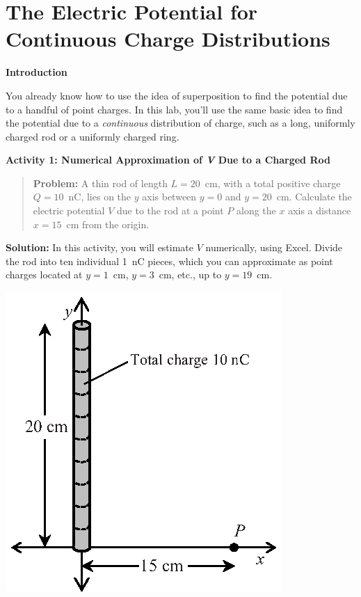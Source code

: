 \section{The Electric Potential for Continuous Charge Distributions}
\label{potential_charge_distributions}


\makelabheader %

\bigskip

\textbf{Introduction} 

You already know how to use the idea of superposition to find the potential due to a handful of point charges.  In this lab, you'll use the same basic idea to find the potential due to a \textit{continuous} distribution of charge, such as a long, uniformly charged rod or a uniformly charged ring.

\bigskip

\textbf{Activity 1: Numerical Approximation of \textit{V} Due to a Charged Rod}

\begin{minipage}{0.64\textwidth}
\begin{quote}
\textbf{Problem:} A thin rod of length $L=20$~cm, with a total positive charge $Q=10$~nC, lies on the $y$ axis between $y=0$ and $y=20$~cm.  Calculate the electric potential $V$ due to the rod at a point $P$ along the $x$ axis a distance $x=15$~cm from the origin. 
\end{quote}

\textbf{Solution:} In this activity, you will estimate $V$ numerically, using Excel.  Divide the rod into ten individual 1~nC pieces, which you can approximate as point charges located at $y=1$~cm, $y=3$~cm, etc., up to $y=19$~cm.  
\end{minipage}
\begin{minipage}{0.35\textwidth}
\vspace{-0.3in}
\raggedleft \includegraphics[scale=0.9]{potential_charge_distributions/rod_axes.eps}
\end{minipage}

